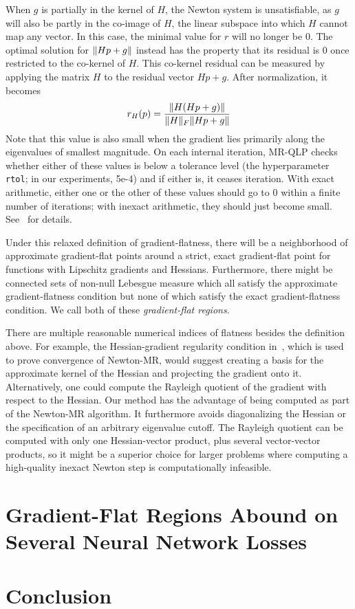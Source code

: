 \documentclass[../../thesis.tex]{subfiles}
\begin{document}
When $g$ is partially in the kernel of $H$,
the Newton system is unsatisfiable,
as $g$ will also be partly in the co-image of $H$,
the linear subspace into which $H$ cannot map any vector.
In this case, the minimal value for $r$ will no longer be $0$.
The optimal solution for $\lVert Hp + g\rVert$
instead has the property that its residual
is $0$ once restricted to the co-kernel of $H$.
This co-kernel residual can be measured by applying the matrix $H$
to the residual vector $Hp + g$.
After normalization, it becomes
\begin{equation}
    r_H(p) = \frac{\lVert H(Hp + g)\rVert}{\lVert H\rVert_F \lVert Hp + g\rVert}
\end{equation}
\noindent Note that this value is also small when the gradient lies
primarily along the eigenvalues of smallest magnitude.
On each internal iteration, MR-QLP checks whether
either of these values is below a tolerance level
(the hyperparameter \texttt{rtol}; in our experiments, 5e-4)
and if either is, it ceases iteration.
With exact arithmetic,
either one or the other of these values
should go to 0 within a finite number of iterations;
with inexact arithmetic, they should just become small.
See~\cite{choi2011} for details.

Under this relaxed definition of gradient-flatness,
there will be a neighborhood of approximate gradient-flat points
around a strict, exact gradient-flat point
for functions with Lipschitz gradients and Hessians.
Furthermore, there might be connected sets of non-null Lebesgue measure
which all satisfy the approximate gradient-flatness condition
but none of which satisfy the exact gradient-flatness condition.
We call both of these \emph{gradient-flat regions}.

There are multiple reasonable numerical indices of flatness besides
the definition above.
For example,
the Hessian-gradient regularity condition in~\cite{roosta2018},
which is used to prove convergence of Newton-MR,
would suggest creating a basis for the approximate kernel of the Hessian
and projecting the gradient onto it.
Alternatively, one could compute the Rayleigh quotient
of the gradient with respect to the Hessian.
Our method has the advantage of being computed as part of the Newton-MR algorithm.
It furthermore avoids diagonalizing the Hessian or the specification
of an arbitrary eigenvalue cutoff.
The Rayleigh quotient can be computed with only one Hessian-vector product,
plus several vector-vector products,
so it might be a superior choice for larger problems where
computing a high-quality inexact Newton step is computationally infeasible.

\section{Gradient-Flat Regions Abound on Several Neural Network Losses}%

\section{Conclusion}%

\onlyinsubfile{\printbibliography}
\end{document}
